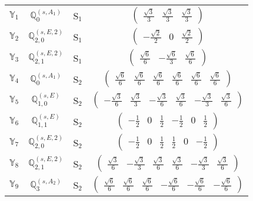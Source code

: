 \documentclass[fleqn,10pt,landscape]{article}
\begin{document}
\begin{itemize}
\begin{center}
\begin{longtable}{c|c|c|c}
$ \mathbb{Y}_{1} $ & $\mathbb{Q}_{0}^{(s,A_{1})}$ & S$_{1}$ & $\begin{pmatrix} \frac{\sqrt{3}}{3} & \frac{\sqrt{3}}{3} & \frac{\sqrt{3}}{3} \end{pmatrix}$ \\
$ \mathbb{Y}_{2} $ & $\mathbb{Q}_{2,0}^{(s,E,2)}$ & S$_{1}$ & $\begin{pmatrix} - \frac{\sqrt{2}}{2} & 0 & \frac{\sqrt{2}}{2} \end{pmatrix}$ \\
$ \mathbb{Y}_{3} $ & $\mathbb{Q}_{2,1}^{(s,E,2)}$ & S$_{1}$ & $\begin{pmatrix} \frac{\sqrt{6}}{6} & - \frac{\sqrt{6}}{3} & \frac{\sqrt{6}}{6} \end{pmatrix}$ \\ \hline
$ \mathbb{Y}_{4} $ & $\mathbb{Q}_{0}^{(s,A_{1})}$ & S$_{2}$ & $\begin{pmatrix} \frac{\sqrt{6}}{6} & \frac{\sqrt{6}}{6} & \frac{\sqrt{6}}{6} & \frac{\sqrt{6}}{6} & \frac{\sqrt{6}}{6} & \frac{\sqrt{6}}{6} \end{pmatrix}$ \\
$ \mathbb{Y}_{5} $ & $\mathbb{Q}_{1,0}^{(s,E)}$ & S$_{2}$ & $\begin{pmatrix} - \frac{\sqrt{3}}{6} & \frac{\sqrt{3}}{3} & - \frac{\sqrt{3}}{6} & \frac{\sqrt{3}}{6} & - \frac{\sqrt{3}}{3} & \frac{\sqrt{3}}{6} \end{pmatrix}$ \\
$ \mathbb{Y}_{6} $ & $\mathbb{Q}_{1,1}^{(s,E)}$ & S$_{2}$ & $\begin{pmatrix} - \frac{1}{2} & 0 & \frac{1}{2} & - \frac{1}{2} & 0 & \frac{1}{2} \end{pmatrix}$ \\
$ \mathbb{Y}_{7} $ & $\mathbb{Q}_{2,0}^{(s,E,2)}$ & S$_{2}$ & $\begin{pmatrix} - \frac{1}{2} & 0 & \frac{1}{2} & \frac{1}{2} & 0 & - \frac{1}{2} \end{pmatrix}$ \\
$ \mathbb{Y}_{8} $ & $\mathbb{Q}_{2,1}^{(s,E,2)}$ & S$_{2}$ & $\begin{pmatrix} \frac{\sqrt{3}}{6} & - \frac{\sqrt{3}}{3} & \frac{\sqrt{3}}{6} & \frac{\sqrt{3}}{6} & - \frac{\sqrt{3}}{3} & \frac{\sqrt{3}}{6} \end{pmatrix}$ \\
$ \mathbb{Y}_{9} $ & $\mathbb{Q}_{3}^{(s,A_{2})}$ & S$_{2}$ & $\begin{pmatrix} \frac{\sqrt{6}}{6} & \frac{\sqrt{6}}{6} & \frac{\sqrt{6}}{6} & - \frac{\sqrt{6}}{6} & - \frac{\sqrt{6}}{6} & - \frac{\sqrt{6}}{6} \end{pmatrix}$ \\ \hline

\end{longtable}
\end{center}
\end{itemize}
\end{document}
